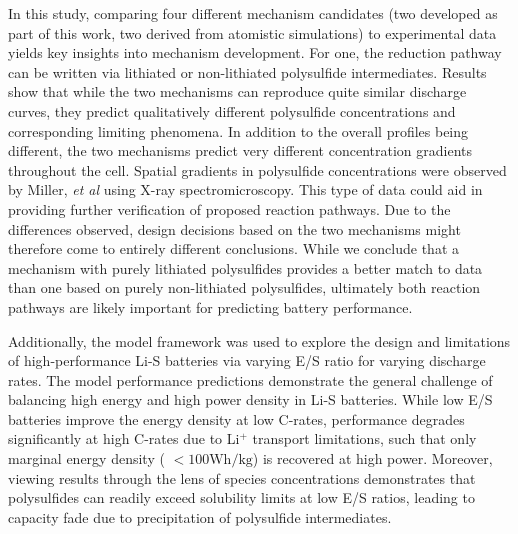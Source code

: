 \documentclass{elsarticle}
\begin{document}
In this study, comparing four different mechanism candidates (two developed as part of this work, two derived from atomistic simulations) to experimental data yields key insights into mechanism development.  For one, the reduction pathway can be written via lithiated or non-lithiated polysulfide intermediates.  Results show that while the two mechanisms can reproduce quite similar discharge curves, they predict qualitatively different polysulfide concentrations and corresponding limiting phenomena. In addition to the overall profiles being different, the two mechanisms predict very different concentration gradients throughout the cell. Spatial gradients in polysulfide concentrations were observed by Miller, \textit{et al} \cite{Miller_2017} using X-ray spectromicroscopy. This type of data could aid in providing further verification of proposed reaction pathways. Due to the differences observed, design decisions based on the two mechanisms might therefore come to entirely different conclusions. While we conclude that a mechanism with purely lithiated polysulfides provides a better match to data than one based on purely non-lithiated polysulfides, ultimately both reaction pathways are likely important for predicting battery performance.~\cite{kamyab2020}

Additionally, the model framework was used to explore the design and limitations of high-performance Li-S batteries via varying E/S ratio for varying discharge rates. The model performance predictions demonstrate the general challenge of balancing high energy and high power density in Li-S batteries.
While low E/S batteries improve the energy density at low C-rates, performance degrades significantly at high C-rates due to Li$^+$ transport limitations, such that only marginal energy density ( $< 100 \mathrm{Wh/kg}$) is recovered at high power.  Moreover, viewing results through the lens of species concentrations demonstrates that polysulfides can readily exceed solubility limits at low E/S ratios, leading to capacity fade due to precipitation of polysulfide intermediates.
\end{document}
